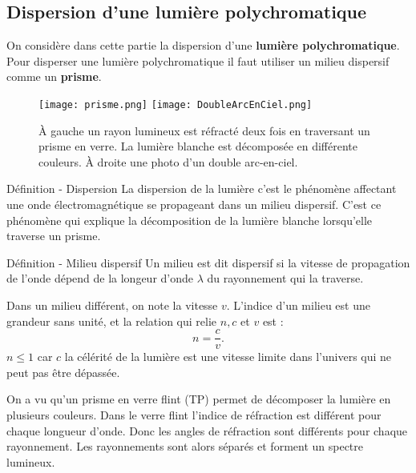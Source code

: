 \documentclass[french, a4paper, 12pt]{article}
\begin{document}
\clearpage
\subsection{Dispersion d'une lumière polychromatique}

On considère dans cette partie la dispersion d'une \textbf{lumière polychromatique}. Pour disperser une lumière polychromatique il faut utiliser un milieu dispersif comme un \textbf{prisme}.

\begin{figure}[ht]
	\centering
	\texttt{[image: prisme.png]}\hspace{1cm}
	\texttt{[image: DoubleArcEnCiel.png]}
	\caption{À gauche un rayon lumineux est réfracté deux fois en traversant un prisme en verre. La lumière blanche est décomposée en différente couleurs. À droite une photo d'un double arc-en-ciel.}
\end{figure}

\begin{definition}{Définition - Dispersion}
	La dispersion de la lumière c'est le phénomène affectant une onde électromagnétique se propageant dans un milieu dispersif. C'est ce phénomène qui explique la décomposition de la lumière blanche lorsqu'elle traverse un prisme.\medskip
\end{definition}\bigskip


\begin{definition}{Définition - Milieu dispersif}
	Un milieu est dit dispersif si la vitesse de propagation de l'onde dépend de la longeur d'onde $\lambda$ du rayonnement qui la traverse.\medskip

	Dans un milieu différent, on note la vitesse $v$. L'indice d'un milieu est une grandeur sans unité, et la relation qui relie $n,c$ et $v$ est : 
	\begin{equation}
		n = \dfrac{c}{v}.
	\end{equation}
	$n\leq 1$ car $c$ la célérité de la lumière est une vitesse limite dans l'univers qui ne peut pas être dépassée.
\end{definition}


On a vu qu'un prisme en verre flint (TP) permet de décomposer la lumière en plusieurs couleurs. Dans le verre flint l'indice de réfraction est différent pour chaque longueur d'onde. Donc les angles de réfraction sont différents pour chaque rayonnement. Les rayonnements sont alors séparés et forment un spectre lumineux.
	
\clearpage
\end{document}
